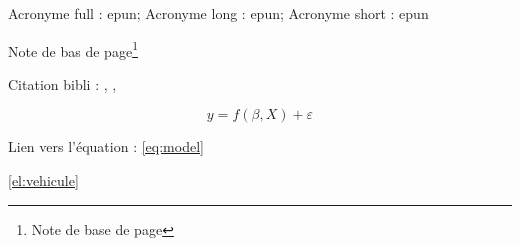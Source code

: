 Acronyme full : \acrfull{epun}; Acronyme long : \acrlong{epun}; Acronyme short : \acrshort{epun}\newline

Note de bas de page\footnote{Note de base de page}\newline

Citation bibli : \cite{scikit-learn}, \cite{gnikit2022}, \cite{gnikit2022,scikit-learn}\newline

\begin{equation}
	y = f(\beta,X) + \varepsilon
	\label{eq:model}
\end{equation}

Lien vers l'équation : \ref{eq:model}


\newpage
\autoref{el:vehicule}
